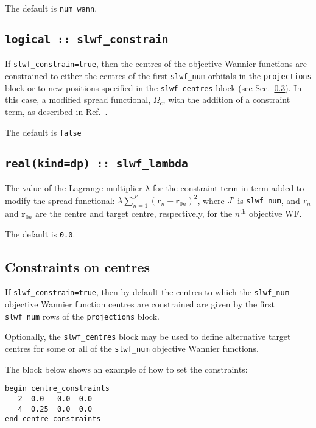 The default is {\tt num\_wann}.

\subsection[slwf\_constrain]{\tt logical :: slwf\_constrain}
If {\tt slwf\_constrain=true}, then the centres of the objective Wannier functions are constrained to either the centres of the first {\tt slwf\_num} orbitals in the {\tt projections} block or to new positions specified in the {\tt slwf\_centres} block (see Sec.~\ref{sec:centre_constraints}). In this case, a modified spread functional, $\Omega_c$, with the addition of a constraint term, as described in Ref.~\cite{Marianetti}.

The default is {\tt false}

\subsection[slwf\_lambda]{\tt real(kind=dp) :: slwf\_lambda}
The value of the Lagrange multiplier $\lambda$ for the constraint term in term added to modify the spread functional: $ \lambda \sum_{n=1}^{J'} \left(\overline{\mathbf{r}}_n - \mathbf{r}_{0n}\right)^2$, where $J'$ is {\tt slwf\_num}, and $\overline{\mathbf{r}}_{n}$ and $\mathbf{r}_{0n}$ are the centre and target centre, respectively, for the $n^{\text{th}}$ objective WF. 

The default is {\tt 0.0}.

\subsection{Constraints on centres}
\label{sec:centre_constraints}

If {\tt slwf\_constrain=true}, then by default the centres to which the {\tt slwf\_num} objective Wannier function centres are constrained are given by the first {\tt slwf\_num} rows of the {\tt projections} block. 

Optionally, the {\tt slwf\_centres} block may be used to define alternative target centres for some or all of the {\tt slwf\_num} objective Wannier functions.

The block below shows an example of how to set the constraints:

\noindent \verb#begin centre_constraints# \\
\verb#   2  0.0   0.0  0.0# \\
\verb#   4  0.25  0.0  0.0# \\
\verb#end centre_constraints#


